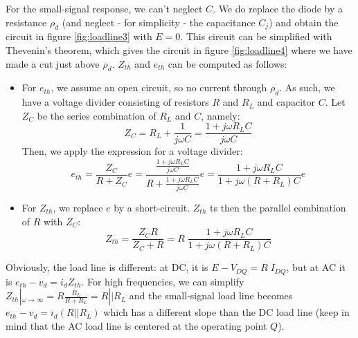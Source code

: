 For the small-signal response, we can't neglect $C$. We do replace the diode by a resistance $\rho_d$ (and neglect - for simplicity - the capacitance $C_j$) and obtain the circuit in figure \ref{fig:loadline3} with $E=0$. This circuit can be simplified with Thevenin's theorem, which gives the circuit in figure \ref{fig:loadline4} where we have made a cut just above $\rho_d$. $Z_{th}$ and $e_{th}$ can be computed as follows:
\begin{itemize}
	\item For $e_{th}$, we assume an open circuit, so no current through $\rho_d$. As such, we have a voltage divider consisting of resistors $R$ and $R_L$ and capacitor $C$. Let $Z_C$ be the series combination of $R_L$ and $C$, namely:
	\begin{equation}
		Z_C = R_L + \frac{1}{j\omega C} = \frac{1+j\omega R_L C}{j\omega C}
		\label{eq:Z_C}
	\end{equation}
	Then, we apply the expression for a voltage divider:
	\begin{equation}
		e_{th} = \frac{Z_C}{R+Z_C} e = \frac{\frac{1+j\omega R_L C}{j\omega C}}{R+\frac{1+j\omega R_L C}{j\omega C}} e = \frac{1 + j\omega R_L C}{1 + j \omega (R + R_L) C} e
	\end{equation}
	
	\item For $Z_{th}$, we replace $e$ by a short-circuit. $Z_{th}$ ts then the parallel combination of $R$ with $Z_C$:
	\begin{equation}
	Z_{th} = \frac{Z_C R}{Z_C + R} = R\;\frac{1 + j\omega R_L C}{1 + j \omega (R + R_L) C}
	\end{equation}
\end{itemize}
Obviously, the load line is different: at DC, it is $E - V_{DQ} = R \; I_{DQ}$, but at AC it is $e_{th} - v_d = i_d Z_{th}$. For high frequencies, we can simplify $Z_{th}|_{\omega \rightarrow \infty} = R\frac{R_L}{R+R_L}=R || R_L$  and the small-signal load line becomes $e_{th} - v_d = i_d (R || R_L)$ which has a different slope than the DC load line (keep in mind that the AC load line is centered at the operating point $Q$).

